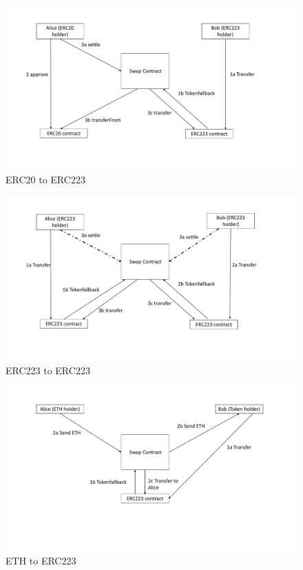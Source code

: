 \begin{figure}[h!]
	\centering
	\includegraphics[width=1\textwidth]{ERC20toERC223}
	\caption{ERC20 to ERC223}
	\label{fig:ERC20toERC223}
	\vspace{-10pt}
\end{figure}

\begin{figure}[h!]
	\centering
	\includegraphics[width=1\textwidth]{ERC223toERC223}
	\caption{ERC223 to ERC223}
	\label{fig:ERC223toERC223}
	\vspace{-10pt}
\end{figure}

\begin{figure}[h!]
	\centering
	\includegraphics[width=1\textwidth]{ETHtoERC223}
	\caption{ETH to ERC223}
	\label{fig:ETHtoERC223}
	\vspace{-10pt}
\end{figure}

